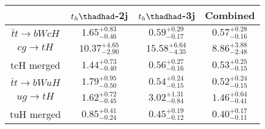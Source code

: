\centering
\begin{tabular}{|c|c|c|c|} \hline
 & $t_h\thadhad$-2j & $t_h\thadhad$-3j & Combined\\\hline
$\bar{t}t\to bWcH$ & $1.65^{+0.83}_{-0.46}$ & $0.59^{+0.29}_{-0.17}$ & $0.57^{+0.28}_{-0.16}$\\\hline
$cg\to tH$ & $10.37^{+4.65}_{-2.90}$ & $15.58^{+6.64}_{-4.35}$ & $8.86^{+3.88}_{-2.48}$\\\hline
tcH merged & $1.44^{+0.73}_{-0.40}$ & $0.56^{+0.27}_{-0.16}$ & $0.53^{+0.25}_{-0.15}$\\\hline
$\bar{t}t\to bWuH$ & $1.79^{+0.95}_{-0.50}$ & $0.54^{+0.24}_{-0.15}$ & $0.52^{+0.24}_{-0.15}$\\\hline
$ug\to tH$ & $1.62^{+0.72}_{-0.45}$ & $3.02^{+1.31}_{-0.84}$ & $1.46^{+0.64}_{-0.41}$\\\hline
tuH merged & $0.85^{+0.41}_{-0.24}$ & $0.45^{+0.19}_{-0.12}$ & $0.40^{+0.17}_{-0.11}$\\\hline
\end{tabular}